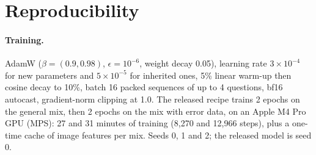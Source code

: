 \documentclass[10pt]{article}
\begin{document}
\section{Reproducibility}
{\sloppy
\paragraph{Training.} AdamW ($\beta=(0.9, 0.98)$, $\epsilon=10^{-6}$, weight decay 0.05), learning rate $3\times10^{-4}$ for new parameters and $5\times10^{-5}$ for inherited ones, 5\% linear warm-up then cosine decay to 10\%, batch 16 packed sequences of up to 4 questions, bf16 autocast, gradient-norm clipping at 1.0. The released recipe trains 2 epochs on the general mix, then 2 epochs on the mix with error data, on an Apple M4 Pro GPU (MPS): 27 and 31 minutes of training (8{,}270 and 12{,}966 steps), plus a one-time cache of image features per mix. Seeds 0, 1 and 2; the released model is seed 0.
}
\end{document}
